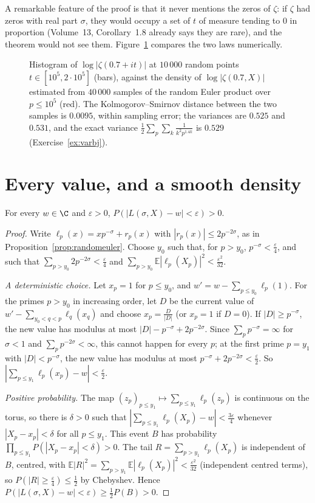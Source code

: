 A remarkable feature of the proof is that it never mentions the zeros of $\zeta$: if $\zeta$ had zeros with real part $\sigma$, they would occupy a set of $t$ of measure tending to $0$ in proportion (Volume~13, Corollary~1.8 already says they are rare), and the theorem would not see them. Figure~\ref{fig:bohrjessen} compares the two laws numerically.

\begin{figure}[ht]
\centering{}
\caption{Histogram of $\log|\zeta(0.7+it)|$ at $10\,000$ random points $t\in[10^5,2\cdot10^5]$ (bars), against the density of $\log|\zeta(0.7,X)|$ estimated from $40\,000$ samples of the random Euler product over $p\le10^5$ (red). The Kolmogorov--Smirnov distance between the two samples is $0.0095$, within sampling error; the variances are $0.525$ and $0.531$, and the exact variance $\frac12\sum_p\sum_k\frac1{k^2p^{1.4k}}$ is $0.529$ (Exercise~\ref{ex:varbj}).}
\label{fig:bohrjessen}
\end{figure}

\section{Every value, and a smooth density}

\begin{lemma}\label{lem:support}
For every $w\in\C$ and $\varepsilon>0$, $P(|L(\sigma,X)-w|<\varepsilon)>0$.
\end{lemma}
\begin{proof}
Write $\ell_p(x)=xp^{-\sigma}+r_p(x)$ with $|r_p(x)|\le2p^{-2\sigma}$, as in Proposition~\ref{prop:randomeuler}. Choose $y_0$ such that, for $p>y_0$, $p^{-\sigma}<\frac\varepsilon4$, and such that $\sum_{p>y_0}2p^{-2\sigma}<\frac\varepsilon4$ and $\sum_{p>y_0}\mathbb E|\ell_p(X_p)|^2<\frac{\varepsilon^2}{32}$.

\emph{A deterministic choice.} Let $x_p=1$ for $p\le y_0$, and $w'=w-\sum_{p\le y_0}\ell_p(1)$. For the primes $p>y_0$ in increasing order, let $D$ be the current value of $w'-\sum_{y_0<q<p}\ell_q(x_q)$ and choose $x_p=\frac D{|D|}$ (or $x_p=1$ if $D=0$). If $|D|\ge p^{-\sigma}$, the new value has modulus at most $|D|-p^{-\sigma}+2p^{-2\sigma}$. Since $\sum_pp^{-\sigma}=\infty$ for $\sigma<1$ and $\sum_pp^{-2\sigma}<\infty$, this cannot happen for every $p$; at the first prime $p=y_1$ with $|D|<p^{-\sigma}$, the new value has modulus at most $p^{-\sigma}+2p^{-2\sigma}<\frac\varepsilon2$. So $|\sum_{p\le y_1}\ell_p(x_p)-w|<\frac\varepsilon2$.

\emph{Positive probability.} The map $(z_p)_{p\le y_1}\mapsto\sum_{p\le y_1}\ell_p(z_p)$ is continuous on the torus, so there is $\delta>0$ such that $|\sum_{p\le y_1}\ell_p(X_p)-w|<\frac{3\varepsilon}4$ whenever $|X_p-x_p|<\delta$ for all $p\le y_1$. This event $B$ has probability $\prod_{p\le y_1}P(|X_p-x_p|<\delta)>0$. The tail $R=\sum_{p>y_1}\ell_p(X_p)$ is independent of $B$, centred, with $\mathbb E|R|^2=\sum_{p>y_1}\mathbb E|\ell_p(X_p)|^2<\frac{\varepsilon^2}{32}$ (independent centred terms), so $P(|R|\ge\frac\varepsilon4)\le\frac12$ by Chebyshev. Hence $P(|L(\sigma,X)-w|<\varepsilon)\ge\frac12P(B)>0$.
\end{proof}

